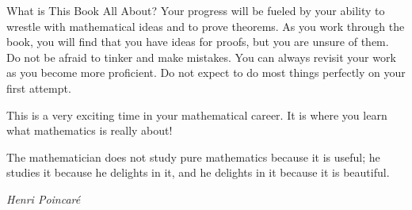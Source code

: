 \begin{section}{What is This Book All About?}
Your progress will be fueled by your ability to wrestle with mathematical ideas and to prove theorems.  As you work through the book, you will find that you have ideas for proofs, but you are unsure of them.  Do not be afraid to tinker and make mistakes.  You can always revisit your work as you become more proficient. Do not expect to do most things perfectly on your first attempt. 


This is a very exciting time in your mathematical career.  It is where you learn what mathematics is really about!

\epigraph{The mathematician does not study pure mathematics because it is useful; he studies it because he delights in it, and he delights in it because it is beautiful.}{\emph{Henri Poincar\'e}}

\end{section}

